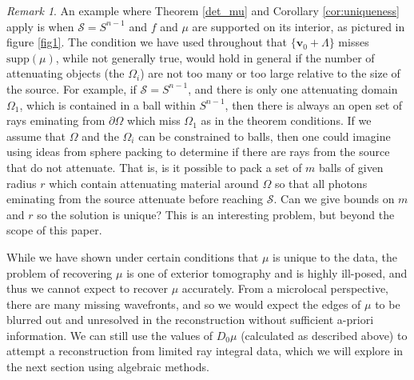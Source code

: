 \documentclass[a4paper,12pt]{amsart}
\numberwithin{equation}{section}
\theoremstyle{plain}
\numberwithin{theorem}{section}
\theoremstyle{definition}
\theoremstyle{remark}
\newtheorem{remark}[theorem]{Remark}
\theoremstyle{remark}
\theoremstyle{remark}
\newcommand{\s}{\mathcal S}
\newcommand{\vv}{{\mathbf{v}}}
\begin{document}
{\begin{remark}
An example where Theorem \ref{det_mu} and Corollary \ref{cor:uniqueness} apply is when $\s = S^{n-1}$ and $f$ and $\mu$ are supported on its interior, as pictured in figure \ref{fig1}. The condition we have used throughout that $\{\vv_0 + \Lambda\}$ misses $\text{supp}(\mu)$, while not generally true, would hold in general if the number of attenuating objects (the $\Omega_i$) are not too many or too large relative to the size of the source. For example, if $\s = S^{n-1}$, and there is only one attenuating domain $\Omega_1$, which is contained in a ball within $S^{n-1}$, then there is always an open set of rays eminating from $\partial \Omega$ which miss $\Omega_1$ as in the theorem conditions. If we assume that $\Omega$ and the $\Omega_i$ can be constrained to balls, then one could imagine using ideas from sphere packing to determine if there are rays from the source that do not attenuate. That is, is it possible to pack a set of $m$ balls of given radius $r$ which contain attenuating material around $\Omega$ so that all photons eminating from the source attenuate before reaching $\s$. Can we give bounds on $m$ and $r$ so the solution is unique? This is an interesting problem, but beyond the scope of this paper.
\end{remark}

While we have shown under certain conditions that $\mu$ is unique to the data, the problem of recovering $\mu$ is one of exterior tomography and is highly ill-posed, and thus we cannot expect to recover $\mu$ accurately. From a microlocal perspective, there are many missing wavefronts, and so we would expect the edges of $\mu$ to be blurred out and unresolved in the reconstruction without sufficient a-priori information. We can still use the values of $D_0\mu$ (calculated as described above) to attempt a reconstruction from limited ray integral data, which we will explore in the next section using algebraic methods.

}
\end{document}
